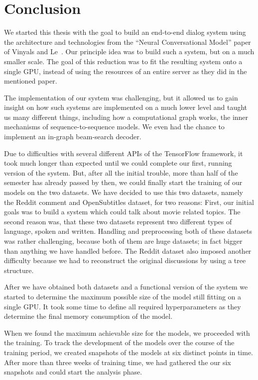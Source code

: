 \chapter{Conclusion}

We started this thesis with the goal to build an end-to-end dialog system using the architecture and technologies from the ``Neural Conversational Model'' paper of Vinyals and Le~\cite{Vinyals:2015}. Our principle idea was to build such a system, but on a much smaller scale. The goal of this reduction was to fit the resulting system onto a single GPU, instead of using the resources of an entire server as they did in the mentioned paper.

The implementation of our system was challenging, but it allowed us to gain insight on how such systems are implemented on a much lower level and taught us many different things, including how a computational graph works, the inner mechanisms of sequence-to-sequence models. We even had the chance to implement an in-graph beam-search decoder.

Due to difficulties with several different APIs of the TensorFlow framework, it took much longer than expected until we could complete our first, running version of the system. But, after all the initial trouble, more than half of the semester has already passed by then, we could finally start the training of our models on the two datasets. We have decided to use this two datasets, namely the Reddit comment and OpenSubtitles dataset, for two reasons: First, our initial goals was to build a system which could talk about movie related topics. The second reason was, that these two datasets represent two different types of language, spoken and written. Handling and preprocessing both of these datasets was rather challenging, because both of them are huge datasets; in fact bigger than anything we have handled before. The Reddit dataset also imposed another difficulty because we had to reconstruct the original discussions by using a tree structure.

After we have obtained both datasets and a functional version of the system we started to determine the maximum possible size of the model still fitting on a single GPU. It took some time to define all required hyperparameters as they determine the final memory consumption of the model.

When we found the maximum achievable size for the models, we proceeded with the training. To track the development of the models over the course of the training period, we created snapshots of the models at six distinct points in time. After more than three weeks of training time, we had gathered the our six snapshots and could start the analysis phase.


